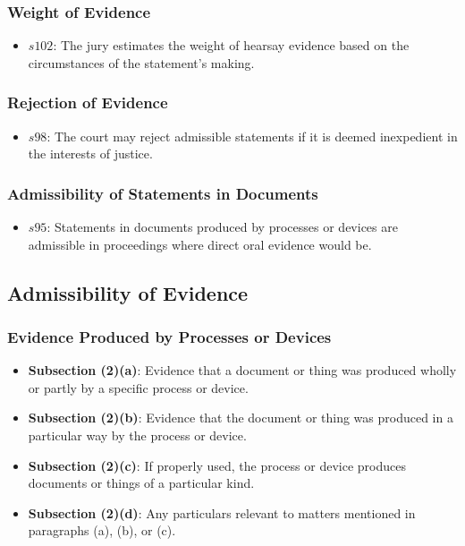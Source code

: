 \subsubsection{Weight of Evidence}\label{weight-of-evidence}

\begin{itemize}
\tightlist
\item
  \(s102\): The jury estimates the weight of hearsay evidence based on
  the circumstances of the statement's making.
\end{itemize}

\subsubsection{Rejection of Evidence}\label{rejection-of-evidence}

\begin{itemize}
\tightlist
\item
  \(s98\): The court may reject admissible statements if it is deemed
  inexpedient in the interests of justice.
\end{itemize}

\subsubsection{Admissibility of Statements in
Documents}\label{admissibility-of-statements-in-documents}

\begin{itemize}
\tightlist
\item
  \(s95\): Statements in documents produced by processes or devices are
  admissible in proceedings where direct oral evidence would be.
\end{itemize}

\subsection{ Admissibility of
Evidence}\label{admissibility-of-evidence-3}

\subsubsection{Evidence Produced by Processes or
Devices}\label{evidence-produced-by-processes-or-devices}

\begin{itemize}
\tightlist
\item
  \textbf{Subsection (2)(a)}: Evidence that a document or thing was
  produced wholly or partly by a specific process or device.
\item
  \textbf{Subsection (2)(b)}: Evidence that the document or thing was
  produced in a particular way by the process or device.
\item
  \textbf{Subsection (2)(c)}: If properly used, the process or device
  produces documents or things of a particular kind.
\item
  \textbf{Subsection (2)(d)}: Any particulars relevant to matters
  mentioned in paragraphs (a), (b), or (c).
\end{itemize}

